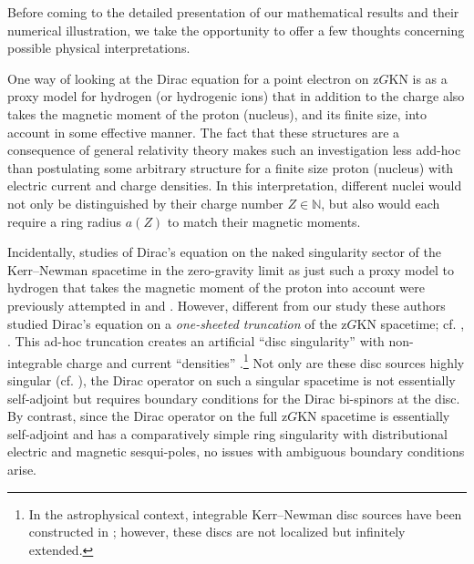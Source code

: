 \documentclass[11 pt]{article}
\newcommand\bbN{{\mathbb N}}
\renewcommand\({\left(}
\renewcommand\){\right)}
\newcommand\<{\langle}
\renewcommand\>{\rangle}
\newcommand\8{\infty}
\begin{document}
   Before coming to the detailed presentation of our mathematical results and their numerical illustration, we take the opportunity to 
offer a few thoughts concerning possible physical interpretations. 
   
    One way of looking at the Dirac equation for a point electron on z$G$KN is as a proxy model for hydrogen (or hydrogenic ions) that in 
addition to the charge also takes the magnetic moment of the proton (nucleus), and its finite size, into account in some effective manner. 
    The fact that these structures are a consequence of general relativity theory makes such an investigation less 
add-hoc than postulating some arbitrary structure for a finite size proton (nucleus) with electric current and charge densities.
  In this interpretation, different nuclei would not only be distinguished by their charge number $Z\in\bbN$, but also would each require
  a ring radius $a(Z)$ to match their magnetic moments.

  Incidentally, studies of Dirac's equation on the naked singularity sector of the Kerr--Newman spacetime in the zero-gravity limit as just such a proxy model
to hydrogen that takes the magnetic moment of the proton into account were previously attempted in \cite{Pek87} and \cite{GairPRIZE}. 
 However, different from our study these authors studied Dirac's equation on a \emph{one-sheeted truncation} of the z$G$KN spacetime; cf.
\cite{Israel}, \cite{LB}.
  This ad-hoc truncation creates an artificial ``disc singularity'' with non-integrable charge and current ``densities'' \cite{Kaiser}.\footnote{In the astrophysical 
context, integrable Kerr--Newman disc sources have been constructed in \cite{LedZofBic98}; however, these discs are not localized but infinitely extended.}
 Not only are these disc sources highly singular (cf. \cite{Kaiser}), the Dirac operator on such a singular spacetime is not essentially self-adjoint
but requires boundary conditions for the Dirac bi-spinors at the disc.
   By contrast, since the Dirac operator on the full z$G$KN spacetime is essentially self-adjoint and has a comparatively simple ring singularity with
distributional electric and magnetic sesqui-poles, no issues with ambiguous boundary conditions arise. 
\end{document}
